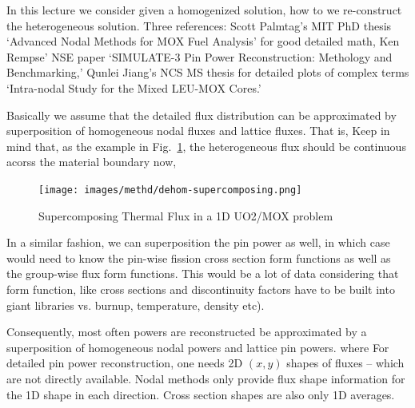 \documentclass{school-22.211-notes}
\date{May  9, 2012}
\begin{document}
\maketitle

In this lecture we consider given a homogenized solution, how to we re-construct the heterogeneous solution. Three references: Scott Palmtag's MIT PhD thesis `Advanced Nodal Methods for MOX Fuel Analysis' for good detailed math, Ken Rempse' NSE paper `SIMULATE-3 Pin Power Reconstruction: Methology and Benchmarking,' Qunlei Jiang's NCS MS thesis for detailed plots of complex terms `Intra-nodal Study for the Mixed LEU-MOX Cores.' 

Basically we assume that the detailed flux distribution can be approximated by superposition of homogeneous nodal fluxes and lattice fluxes. That is, 
Keep in mind that, as the example in Fig.~\ref{dehom-supercomposing}, the heterogeneous flux should be continuous acorss the material boundary now, 
\begin{figure}[ht]
  \centering
  \texttt{[image: images/methd/dehom-supercomposing.png]}
  \caption{Supercomposing Thermal Flux in a 1D UO2/MOX problem} \label{dehom-supercomposing}
\end{figure}
In a similar fashion, we can superposition the pin power as well, in which case would need to know the pin-wise fission cross section form functions as well as the group-wise flux form functions. This would be a lot of data considering that form function, like cross sections and discontinuity factors have to be built into giant libraries vs. burnup, temperature, density etc). 

Consequently, most often powers are reconstructed be approximated by a superposition of homogeneous nodal powers and lattice pin powers. 
where
For detailed pin power reconstruction, one needs 2D $(x,y)$ shapes of fluxes -- which are not directly available. Nodal methods only provide flux shape information for the 1D shape in each direction. Cross section shapes are also only 1D averages. 
\end{document}
